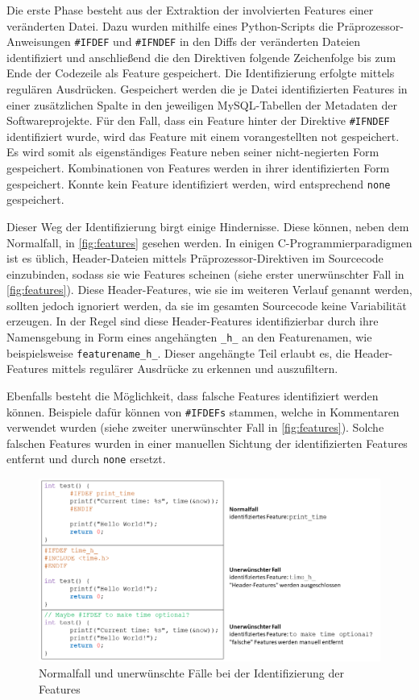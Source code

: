 Die erste Phase besteht aus der Extraktion der involvierten Features einer veränderten Datei. Dazu wurden mithilfe eines Python-Scripts die Präprozessor-Anweisungen \texttt{\#IFDEF} und \texttt{\#IFNDEF} in den Diffs der veränderten Dateien identifiziert und anschließend die den Direktiven folgende Zeichenfolge bis zum Ende der Codezeile als Feature gespeichert. Die Identifizierung erfolgte mittels regulären Ausdrücken. Gespeichert werden die je Datei identifizierten Features in einer zusätzlichen Spalte in den jeweiligen MySQL-Tabellen der Metadaten der Softwareprojekte. Für den Fall, dass ein Feature hinter der Direktive \texttt{\#IFNDEF} identifiziert wurde, wird das Feature mit einem vorangestellten \glqq not\grqq{} gespeichert. Es wird somit als eigenständiges Feature neben seiner nicht-negierten Form gespeichert. Kombinationen von Features werden in ihrer identifizierten Form gespeichert. Konnte kein Feature identifiziert werden, wird entsprechend \glqq \texttt{none}\grqq{} gespeichert.

Dieser Weg der Identifizierung birgt einige Hindernisse. Diese können, neben dem Normalfall, in \autoref{fig:features} gesehen werden. In einigen C-Programmierparadigmen ist es üblich, Header-Dateien mittels Präprozessor-Direktiven im Sourcecode einzubinden, sodass sie wie Features scheinen (siehe erster unerwünschter Fall in \autoref{fig:features}). Diese \glqq Header-Features\grqq{}, wie sie im weiteren Verlauf genannt werden, sollten jedoch ignoriert werden, da sie im gesamten Sourcecode keine Variabilität erzeugen. In der Regel sind diese Header-Features identifizierbar durch ihre Namensgebung in Form eines angehängten \texttt{\_h\_} an den Featurenamen, wie beispielsweise \texttt{featurename\_h\_}. Dieser angehängte Teil erlaubt es, die Header-Features mittels regulärer Ausdrücke zu erkennen und auszufiltern. 

Ebenfalls besteht die Möglichkeit, dass \glqq falsche\grqq{} Features identifiziert werden können. Beispiele dafür können von \texttt{\#IFDEFs} stammen, welche in Kommentaren verwendet wurden (siehe zweiter unerwünschter Fall in \autoref{fig:features}). Solche falschen Features wurden in einer manuellen Sichtung der identifizierten Features entfernt und durch \glqq \texttt{none}\grqq{} ersetzt.

\begin{figure}[ht]
    \centering
    \includegraphics[width=\textwidth]{images/Features}
    \caption{Normalfall und unerwünschte Fälle bei der Identifizierung der Features\label{fig:features}}
\end{figure}

